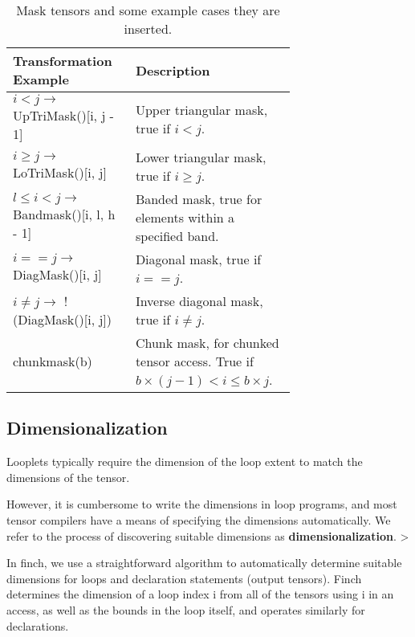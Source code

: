     \begin{table}[h]
        \scriptsize
        \centering
        \begin{tabular}{|>{\raggedright\arraybackslash}m{0.3\linewidth}|>{\raggedright\arraybackslash}m{0.4\linewidth}|}
        \hline
        \textbf{Transformation Example} & \textbf{Description} \\
        \hline
        $i < j \rightarrow$ UpTriMask()[i, j - 1] & Upper triangular mask, true if $i < j$. \\
        \hline
        $i \geq j \rightarrow$ LoTriMask()[i, j] & Lower triangular mask, true if $i \geq j$. \\
        \hline
        $l \leq i < j \rightarrow$ Bandmask()[i, l, h - 1] & Banded mask, true for elements within a specified band. \\
        \hline
        $i == j \rightarrow$ DiagMask()[i, j] & Diagonal mask, true if $i == j$. \\
        \hline
        $i \neq j \rightarrow$ !(DiagMask()[i, j]) & Inverse diagonal mask, true if $i \neq j$. \\
        \hline
        chunkmask(b) & Chunk mask, for chunked tensor access. True if $b \times (j - 1) < i \leq b \times j$. \\
        \hline
        \end{tabular}
        \caption{Mask tensors and some example cases they are inserted.}
        \label{table:masks}
    \end{table}
    
\subsection{Dimensionalization}
    Looplets typically require the dimension of the loop extent to match the
    dimensions of the tensor. 

    
    However, it is cumbersome to write the dimensions
    in loop programs, and most tensor compilers have a means of specifying the
    dimensions automatically. We refer to the process of discovering suitable
    dimensions as \textbf{dimensionalization}. >

    In finch, we use a straightforward algorithm to automatically determine
    suitable dimensions for loops and declaration statements (output tensors).
    Finch determines the dimension of a loop index i from all of the tensors
    using i in an access, as well as the bounds in the loop itself, and operates
    similarly for declarations.

